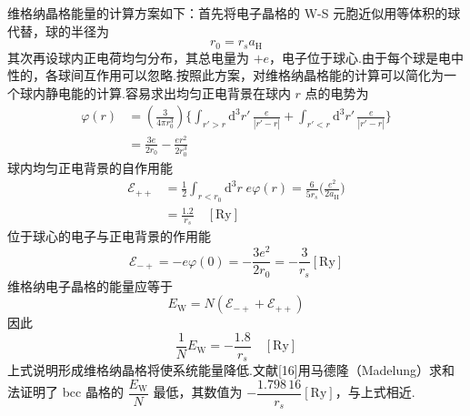 维格纳晶格能量的计算方案如下：首先将电子晶格的 W-S 元胞近似用等体积的球代替，球的半径为
\begin{equation}
  r_{0}=r_{s}a_{\mathrm{H}}
\end{equation}
其次再设球内正电荷均匀分布，其总电量为 $+e$，电子位于球心.由于每个球是电中性的，各球间互作用可以忽略.按照此方案，对维格纳晶格能的计算可以简化为一个球内静电能的计算.容易求出均匀正电背景在球内 $r$ 点的电势为
\begin{equation}
\begin{aligned}
  \varphi(r)&=\left(\frac{3}{4\pi r_{0}^{3}}\right)
  \bigg\{\int_{r'>r}\mathrm{d}^{3}r'\,\frac{e}{|r'-r|}
  +\int_{r'<r}\mathrm{d}^{3}r'\,\frac{e}{|r'-r|}\bigg\}\\
  &=\frac{3e}{2r_{0}}-\frac{er^{2}}{2r_{0}^{3}}
\end{aligned}
\end{equation}
球内均匀正电背景的自作用能
\begin{equation}
\begin{aligned}
  \mathcal{E}_{++}
  &=\frac{1}{2}\int_{r<r_{0}}\mathrm{d}^{3}r\;e\varphi(r)
  =\frac{6}{5r_{s}}\bigg(\frac{e^{2}}{2a_{\mathrm{H}}}\bigg)\\
  &=\frac{1.2}{r_{s}}\quad\left[\mathrm{Ry}\right]
\end{aligned}
\end{equation}
位于球心的电子与正电背景的作用能
\begin{equation}
  \mathcal{E}_{-+}=-e\varphi(0)=-\frac{3e^{2}}{2r_{0}}
  =-\frac{3}{r_{s}}\left[\mathrm{Ry}\right]
\end{equation}
维格纳电子晶格的能量应等于
\begin{equation}
  E_{\mathrm{W}}=N\left(\mathcal{E}_{-+}+\mathcal{E}_{++}\right)
\end{equation}
因此
\begin{equation}
  \frac{1}{N}E_{\mathrm{W}}=-\frac{1.8}{r_{s}}\quad\left[\mathrm{Ry}\right]
\end{equation}
上式说明形成维格纳晶格将使系统能量降低.文献[16]用马德隆（Madelung）求和法证明了 bcc 晶格的 $\dfrac{E_{\mathrm{W}}}{N}$ 最低，其数值为 $-\dfrac{1.798\,16}{r_{s}}[\mathrm{Ry}]$，与上式相近.

